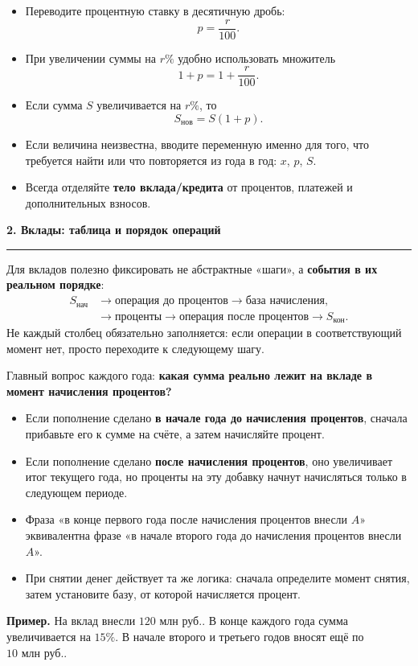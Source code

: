 \documentclass[a4paper,12pt]{article}
\newcommand{\sectiontitle}[1]{%
  \vspace{0.4em}
  {\Large\bfseries\color{darkaccent}#1}\par
  \vspace{0.15em}
  {\color{accent}\rule{\linewidth}{0.6pt}}\par
  \vspace{0.25em}
}
\newcommand{\checkitem}{\item[$\square$]}
\newcommand{\mlnrub}{\text{ млн руб.}}
\begin{document}
\begin{itemize}
\checkitem Переводите процентную ставку в десятичную дробь:
\[
p=\frac{r}{100}.
\]

\checkitem При увеличении суммы на \(r\%\) удобно использовать множитель
\[
1+p=1+\frac{r}{100}.
\]

\checkitem Если сумма \(S\) увеличивается на \(r\%\), то
\[
S_{\text{нов}}=S(1+p).
\]

\checkitem Если величина неизвестна, вводите переменную именно для того, что требуется найти
или что повторяется из года в год: \(x\), \(p\), \(S\).

\checkitem Всегда отделяйте \textbf{тело вклада/кредита} от процентов, платежей и дополнительных взносов.
\end{itemize}

\sectiontitle{2. Вклады: таблица и порядок операций}

Для вкладов полезно фиксировать не абстрактные «шаги», а \textbf{события в их реальном порядке}:
\[
\begin{aligned}
S_{\text{нач}}
&\to \text{операция до процентов}
\to \text{база начисления},\\
&\to \text{проценты}
\to \text{операция после процентов}
\to S_{\text{кон}}.
\end{aligned}
\]
Не каждый столбец обязательно заполняется: если операции в соответствующий момент нет, просто переходите к следующему шагу.

Главный вопрос каждого года: \textbf{какая сумма реально лежит на вкладе в момент начисления процентов?}

\begin{itemize}
\checkitem Если пополнение сделано \textbf{в начале года до начисления процентов}, сначала прибавьте его к сумме на счёте, а затем начисляйте процент.

\checkitem Если пополнение сделано \textbf{после начисления процентов}, оно увеличивает итог текущего года, но проценты на эту добавку начнут начисляться только в следующем периоде.

\checkitem Фраза «в конце первого года после начисления процентов внесли \(A\)» эквивалентна фразе
«в начале второго года до начисления процентов внесли \(A\)».

\checkitem При снятии денег действует та же логика: сначала определите момент снятия, затем установите базу, от которой начисляется процент.
\end{itemize}

\textbf{Пример.}
На вклад внесли \(120\mlnrub\). В конце каждого года сумма увеличивается на \(15\%\).
В начале второго и третьего годов вносят ещё по \(10\mlnrub\).
\end{document}
